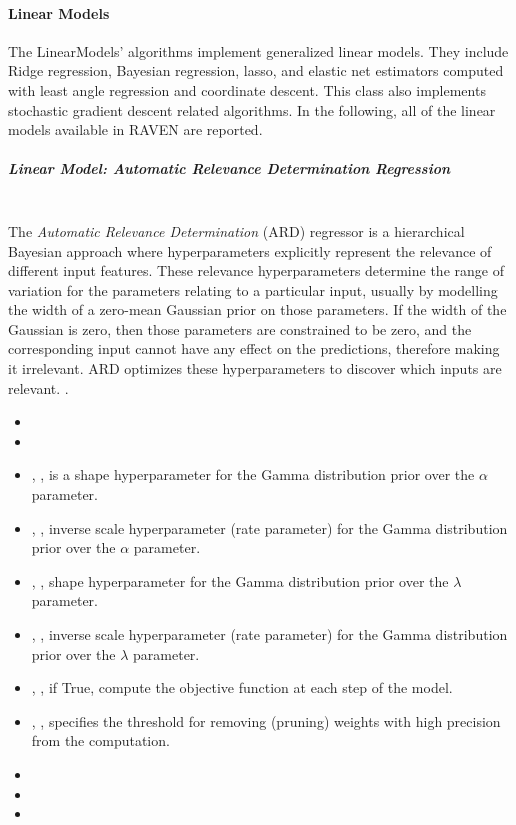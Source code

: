 \paragraph{Linear Models}
\label{LinearModels}
The LinearModels' algorithms implement generalized linear models.
%
They include Ridge regression, Bayesian regression, lasso, and elastic net
estimators computed with least angle regression and coordinate descent.
%
This class also implements stochastic gradient descent related algorithms.
%
In the following, all of the linear models available in RAVEN are reported.
%
\subparagraph{Linear Model: Automatic Relevance Determination Regression}
\mbox{}
\\The \textit{Automatic Relevance Determination} (ARD) regressor is a
hierarchical Bayesian approach where hyperparameters explicitly represent the
relevance of different input features.
%
These relevance hyperparameters determine the range of variation for the
parameters relating to a particular input, usually by modelling the width of a
zero-mean Gaussian prior on those parameters.
%
If the width of the Gaussian is zero, then those parameters are constrained to
be zero, and the corresponding input cannot have any effect on the predictions,
therefore making it irrelevant.
%
ARD optimizes these hyperparameters to discover which inputs are relevant.
%
.
\begin{itemize}
  \item {}
  \item {}
  \item {}, , is a shape
  hyperparameter for the Gamma distribution prior over the $\alpha$ parameter.
  \item {}, , inverse scale
  hyperparameter (rate parameter) for the Gamma distribution prior over the
  $\alpha$ parameter.
  \item {}, , shape
  hyperparameter for the Gamma distribution prior over the $\lambda$ parameter.
  \item {}, , inverse scale
  hyperparameter (rate parameter) for the Gamma distribution prior over the
  $\lambda$ parameter.
  \item {}, , if True,
  compute the objective function at each step of the model.
  \item {}, , specifies
  the threshold for removing (pruning) weights with high precision from the
  computation.
  \item {}
  \item {}
  \item {}
\end{itemize}


